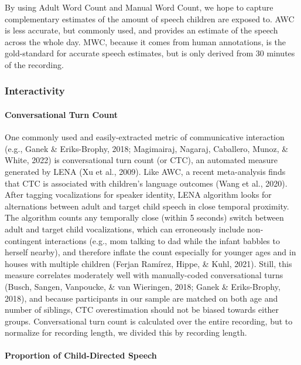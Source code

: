 \documentclass[
  man,floatsintext]{apa6}
\let\oldparagraph\paragraph
\renewcommand{\paragraph}[1]{\oldparagraph{#1}\mbox{}}
\begin{document}
By using Adult Word Count and Manual Word Count, we hope to capture complementary estimates of the amount of speech children are exposed to. AWC is less accurate, but commonly used, and provides an estimate of the speech across the whole day. MWC, because it comes from human annotations, is the gold-standard for accurate speech estimates, but is only derived from 30 minutes of the recording.

\hypertarget{interactivity}{%
\subsubsection{Interactivity}\label{interactivity}}

\hypertarget{conversational-turn-count}{%
\paragraph{Conversational Turn Count}\label{conversational-turn-count}}

One commonly used and easily-extracted metric of communicative interaction (e.g., Ganek \& Eriks-Brophy, 2018; Magimairaj, Nagaraj, Caballero, Munoz, \& White, 2022) is conversational turn count (or CTC), an automated measure generated by LENA (Xu et al., 2009). Like AWC, a recent meta-analysis finds that CTC is associated with children's language outcomes (Wang et al., 2020). After tagging vocalizations for speaker identity, LENA algorithm looks for alternations between adult and target child speech in close temporal proximity. The algorithm counts any temporally close (within 5 seconds) switch between adult and target child vocalizations, which can erroneously include non-contingent interactions (e.g., mom talking to dad while the infant babbles to herself nearby), and therefore inflate the count especially for younger ages and in houses with multiple children (Ferjan Ramírez, Hippe, \& Kuhl, 2021). Still, this measure correlates moderately well with manually-coded conversational turns (Busch, Sangen, Vanpoucke, \& van Wieringen, 2018; Ganek \& Eriks-Brophy, 2018), and because participants in our sample are matched on both age and number of siblings, CTC overestimation should not be biased towards either groups. Conversational turn count is calculated over the entire recording, but to normalize for recording length, we divided this by recording length.

\hypertarget{proportion-of-child-directed-speech}{%
\paragraph{Proportion of Child-Directed Speech}\label{proportion-of-child-directed-speech}}
\end{document}
